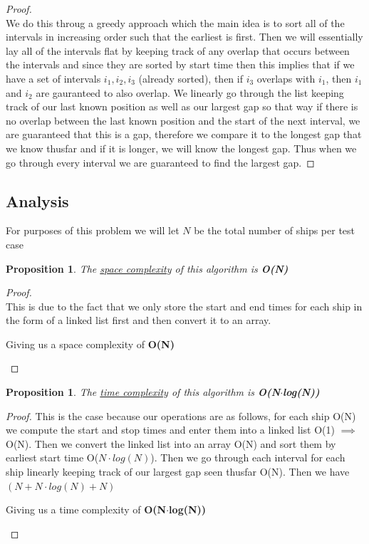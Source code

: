 \documentclass[12pt]{article}
\newtheorem{proposition}[theorem]{Proposition}
\begin{document}
\begin{proof}
~ \\ \indent We do this throug a greedy approach which the main idea is to sort all of the intervals in increasing
order such that the earliest is first. Then we will essentially lay all of the intervals flat by keeping track of
any overlap that occurs between the intervals and since they are sorted by start time then this implies that if we
have a set of intervals $i_1, i_2, i_3$ (already sorted), then if $i_3$ overlaps with $i_1$, then $i_1$ and $i_2$ are
gauranteed to also overlap. We linearly go through the list keeping track of our last known position as well as our
largest gap so that way if there is no overlap between the last known position and the start of the next interval,
we are guaranteed that this is a gap, therefore we compare it to the longest gap that we know thusfar and if it is
longer, we will know the longest gap. Thus when we go through every interval we are guaranteed to find the largest gap.
\end{proof}


\subsection{Analysis}
For purposes of this problem we will let $N$ be the total number of ships per test case

\begin{proposition}
\label{numq}
The \underline{space complexity} of this algorithm is \textbf{O(N)}
\end{proposition}

\begin{proof}
~ \\ \indent This is due to the fact that we only store the start and end times for each ship
in the form of a linked list first and then convert it to an array.
\begin{center}
    Giving us a space complexity of \textbf{O(N)}
\end{center}
\end{proof}

\begin{proposition}
\label{numq}
The \underline{time complexity} of this algorithm is \textbf{O(N$\cdot$log(N))}
\end{proposition}

\begin{proof}
This is the case because our operations are as follows, for each ship O(N) we compute the start
and stop times and enter them into a linked list O(1) $\implies$ O(N). Then we convert the linked
list into an array O(N) and sort them by earliest start time O($N\cdot log(N)$). Then we go through
each interval for each ship linearly keeping track of our largest gap seen thusfar O(N). Then we
have $(N + N\cdot log(N) + N)$


\begin{center}
    Giving us a time complexity of \textbf{O(N$\cdot$log(N))}
\end{center}
\end{proof}
\end{document}
